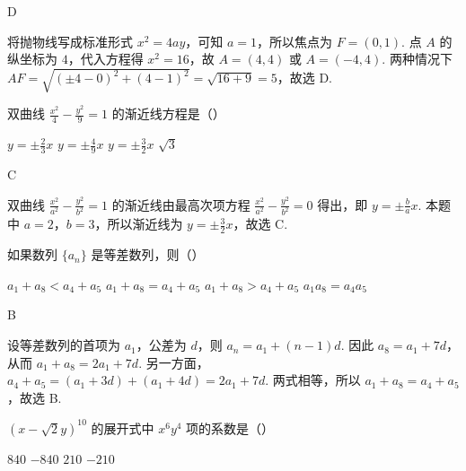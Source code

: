 \begin{answer}D\end{answer}

\begin{solution}
将抛物线写成标准形式 \(x^{2}=4ay\)，可知 \(a=1\)，所以焦点为 \(F=(0,1)\). 点 \(A\) 的纵坐标为 \(4\)，代入方程得 \(x^{2}=16\)，故 \(A=(4,4)\) 或 \(A=(-4,4)\). 两种情况下 \(AF=\sqrt{(\pm4-0)^{2}+(4-1)^{2}}=\sqrt{16+9}=5\)，故选 D.
\end{solution}

\begin{problem}
双曲线 \(\frac{x^2}{4} - \frac{y^2}{9} = 1\) 的渐近线方程是（\quad）

\choices
    {\( y = \pm \frac{2}{3} x \)}
    {\( y = \pm \frac{4}{9} x \)}
    {\( y = \pm \frac{3}{2} x \)}
    {\(\sqrt{3}\)}
\end{problem}

\begin{answer}C\end{answer}

\begin{solution}
双曲线 \(\frac{x^{2}}{a^{2}}-\frac{y^{2}}{b^{2}}=1\) 的渐近线由最高次项方程 \(\frac{x^{2}}{a^{2}}-\frac{y^{2}}{b^{2}}=0\) 得出，即 \(y=\pm\frac{b}{a}x\). 本题中 \(a=2\)，\(b=3\)，所以渐近线为 \(y=\pm\frac{3}{2}x\)，故选 C.
\end{solution}

\begin{problem}
如果数列 \(\{a_{n}\}\) 是等差数列，则（\quad）

\choices
    {\(a_1 + a_8 < a_4 + a_5\)}
    {\(a_1 + a_8 = a_4 + a_5\)}
    {\(a_{1} + a_{8} > a_{4} + a_{5}\)}
    {\(a_{1}a_{8} = a_{4}a_{5}\)}
\end{problem}

\begin{answer}B\end{answer}

\begin{solution}
设等差数列的首项为 \(a_{1}\)，公差为 \(d\)，则 \(a_{n}=a_{1}+(n-1)d\). 因此 \(a_{8}=a_{1}+7d\)，从而 \(a_{1}+a_{8}=2a_{1}+7d\). 另一方面，\(a_{4}+a_{5}=\left(a_{1}+3d\right)+\left(a_{1}+4d\right)=2a_{1}+7d\). 两式相等，所以 \(a_{1}+a_{8}=a_{4}+a_{5}\)，故选 B.
\end{solution}

\begin{problem}
\((x - \sqrt{2} y)^{10}\) 的展开式中 \(x^{6}y^{4}\) 项的系数是（\quad）

\choices
    {\(840\)}
    {\(-840\)}
    {\(210\)}
    {\(-210\)}
\end{problem}

